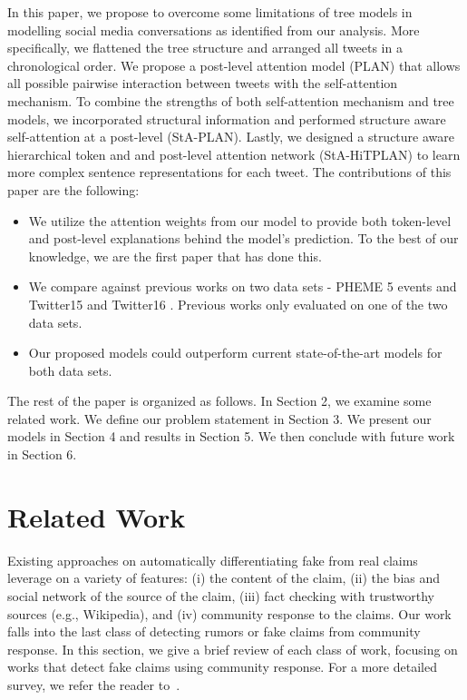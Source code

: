 \documentclass[letterpaper]{article} %
\begin{document}
In this paper, we propose to overcome some limitations of tree models in modelling social media conversations as identified from our analysis. More specifically, we flattened the tree structure and arranged all tweets in a chronological order. We propose a post-level attention model (PLAN) that allows all possible pairwise interaction between tweets with the self-attention mechanism. To combine the strengths of both self-attention mechanism and tree models, we incorporated structural information and performed structure aware self-attention at a post-level (StA-PLAN). Lastly, we designed a structure aware hierarchical token and and post-level attention network (StA-HiTPLAN) to learn more complex sentence representations for each tweet. \newline
\newline 
The contributions of this paper are the following:
\begin{itemize}
    \item We utilize the attention weights from our model to provide both token-level and post-level explanations behind the model's prediction. To the best of our knowledge, we are the first paper that has done this.
    \item We compare against previous works on two data sets - PHEME 5 events \cite{kochkina_liakata_zubiaga_2018} and Twitter15 and Twitter16 \cite{ma17}. Previous works only evaluated on one of the two data sets. 
    \item  Our proposed models could outperform current state-of-the-art models for both data sets.
\end{itemize}

The rest of the paper is organized as follows. In Section 2, we examine some related work. We define our problem statement in Section 3. We present our models in Section 4 and results in Section 5. We then conclude with future work in Section 6.

\section{Related Work}

Existing approaches on automatically differentiating fake from real claims leverage on a variety of features: (i) the  content of the claim, (ii) the bias and social network of the source of the claim,  (iii) fact checking with trustworthy sources (e.g., Wikipedia), and (iv) community response to the claims. Our work falls into the last class of detecting rumors or fake claims from community response. In this section, we give a brief review of each class of work, focusing on works that detect fake claims using community response. For a more detailed survey, we refer the reader to~\cite{sharma2019}.
\end{document}
